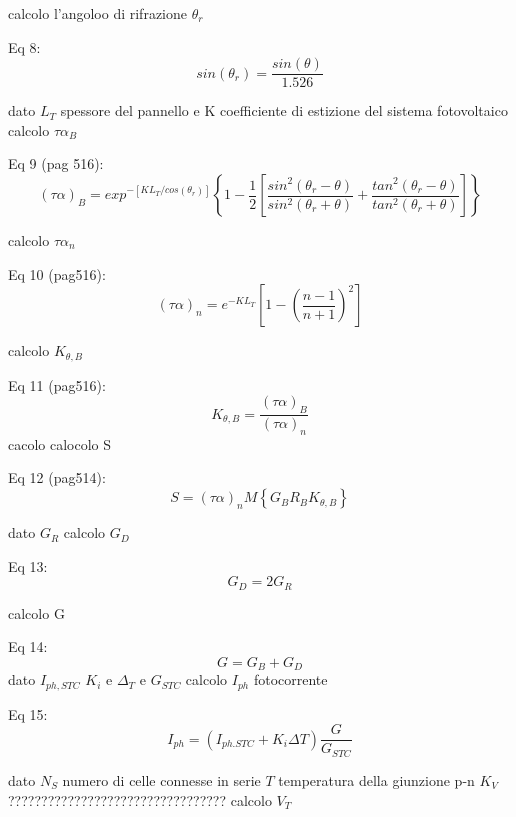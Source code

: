 \documentclass{article}
\begin{document}
calcolo l'angoloo di rifrazione $\theta_{r}$

Eq 8:
\begin{equation}
    sin(\theta_{r})=\frac{sin(\theta)}{1.526}
\end{equation}

dato $L_{T}$ spessore del pannello e K coefficiente di estizione del sistema fotovoltaico calcolo $\tau \alpha _{B}$

Eq 9 (pag 516):
\begin{equation}
    (\tau \alpha)_{B}=exp^{-[KL_{T}/cos(\theta_{r})]} \left\{1-\frac{1}{2}\left[\frac{sin^{2}(\theta_{r}-\theta)}{sin^{2}(\theta_{r}+\theta)}+\frac{tan^{2}(\theta_{r}-\theta)}{tan^{2}(\theta_{r}+\theta)}\right]\right\}
\end{equation}

calcolo $\tau \alpha _{n}$

Eq 10 (pag516):
\begin{equation}
   (\tau \alpha)_{n} =e^{-KL_{T}}\left[1-\left(\frac{n-1}{n+1}\right)^2\right]
\end{equation}

calcolo $K_{\theta , B}$

 Eq 11 (pag516):
\begin{equation}
   K_{\theta,B}=\frac{(\tau \alpha)_{B}}{(\tau \alpha)_{n}}
\end{equation}
cacolo
calocolo S

Eq 12 (pag514):
\begin{equation}
   S=(\tau \alpha)_{n} M\left\{G_{B} R_{B} K_{\theta,B}\right\}
\end{equation}

dato $G_{R}$ calcolo $G_{D}$

Eq 13:
\begin{equation}
    G _{D}=2G_{R}
\end{equation}

calcolo G

Eq 14:
\begin{equation}
    G=G_{B}+G_{D}
\end{equation}
dato $I_{ph,STC}$ $K_{i}$ e $\Delta_{T}$ e $G_{STC}$ calcolo $I_{ph}$ fotocorrente

Eq 15:
\begin{equation}
    I_{ph}=(I_{ph.STC}+K_{i}\Delta T)\frac{G}{G_{STC}}
\end{equation}

dato $N_{S}$ numero di celle connesse in serie $T$ temperatura della giunzione p-n $K_{V}$ ????????????????????????????????? calcolo $V_{T}$
\end{document}

